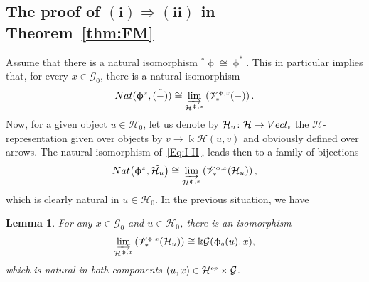\documentclass[11pt]{article}
\numberwithin{equation}{section}
\newtheorem{Lemma}[Theorem]{Lemma}
\newcommand{\Vect}{{\rm Vect}_{\Sscript{\Bbbk}}}
\newcommand{\Go}{\cG_{\Sscript{0}}}
\newcommand{\Ho}{\cH_{\Sscript{0}}}
\newcommand{\vV}{\mathscr{V}}
\newcommand{\cG}{{\mathcal G}}
\newcommand{\cH}{{\mathcal H}}
\newcommand{\Sscript}[1]{\scriptscriptstyle{#1}}
\newcommand{\injlimit}[2]{\varinjlim_{#1}\left({#2}\right)}
\newcommand{\phio}{\upphi_{\Sscript{0}}}
\begin{document}
\subsection[The proof of $(i) \Rightarrow (ii)$ in Theorem~\ref{thm:FM}]{The proof of $\boldsymbol{(i) \Rightarrow (ii)}$ in Theorem~\ref{thm:FM}}\label{sssec:I-II}
Assume that there is a natural isomorphism ${}^{*}\upphi \cong \upphi^{*}$. This in particular implies that, for every $x \in \Go$, there is a natural isomorphism
\begin{gather}\label{Eq:I-II}
{\rm Nat}(\upphi^{\Sscript{x}}, \tilde{(-)}) \cong \injlimit{\cH^{\Sscript{\upphi, x}}}{\vV^{\Sscript{\upphi, x}}_*(-)}.
\end{gather}
Now, for a given object $u \in \Ho$, let us denote by $\cH_{u}\colon \cH \to \Vect$ the $\cH$-representation given over objects by $v \to \Bbbk \cH(u, v)$ and obviously defined over arrows. The natural isomorphism of~\eqref{Eq:I-II}, leads then to a family of bijections
\begin{gather*}
{\rm Nat}\big(\upphi^{\Sscript{x}}, \tilde{\cH_{u}}\big) \cong \injlimit{\cH^{\Sscript{\upphi, x}}}{\vV^{\Sscript{\upphi, x}}_*(\cH_{u})},
\end{gather*}
which is clearly natural in $u \in \Ho$. In the previous situation, we have
\begin{Lemma}\label{lema:I-II-1} For any $x \in\Go$ and $u \in \Ho$, there is an isomorphism
\begin{gather*}
\injlimit{\cH^{\Sscript{\upphi, x}}}{\vV^{\Sscript{\upphi,x}}_*(\cH_{u})} \cong \Bbbk \cG(\phio(u),x),
\end{gather*}
which is natural in both components $(u, x) \in \cH^{\Sscript{\rm op}} \times \cG$.
\end{Lemma}
\end{document}
